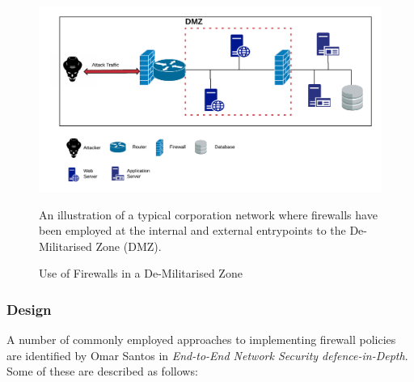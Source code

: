 \begin{figure}[ht]
      \centering
      \includegraphics[width=175mm, scale=1]{Images/Illustration_of_Firewalls_in_a_DMZ.png}
      \caption{Use of Firewalls in a De-Militarised Zone}
      \medskip
	  \small
		An illustration of a typical corporation network where firewalls have been employed at the internal and external entrypoints to the De-Militarised Zone (DMZ).
\label{fig:Firewall_DMZ_Illustration}
\end{figure}

\subsubsection{Design}
A number of commonly employed approaches to implementing firewall policies are identified by Omar Santos in \textit{End-to-End Network Security defence-in-Depth}. \cite{OmarSantos} Some of these are described as follows:

